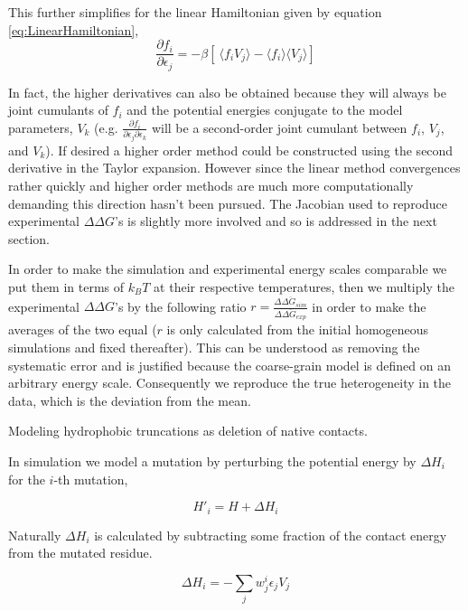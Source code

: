 \documentclass[preprint]{elsarticle}
\begin{document}
    This further simplifies for the linear Hamiltonian given by equation
\ref{eq:LinearHamiltonian},
\begin{equation} \label{eq:JacobianStructural}
    \frac{\partial f_i}{\partial\epsilon_j} = -\beta\left[ \
    \langle f_i V_j \rangle - \langle f_i \rangle \langle V_j \rangle\right]  
\end{equation}

    In fact, the higher derivatives can also be obtained because
they will always be joint cumulants of $f_i$ and the potential energies
conjugate to the model parameters, ${V_k}$ (e.g. $\frac{\partial
f_i}{\partial\epsilon_j\partial\epsilon_k}$ will be a second-order joint
cumulant between $f_i$, $V_j$, and $V_k$). If desired a higher order method
could be constructed using the second derivative in the Taylor expansion.
However since the linear method convergences rather quickly and higher order
methods are much more computationally demanding this direction hasn't been
pursued. The Jacobian used to reproduce experimental $\Delta\Delta G$'s
is slightly more involved and so is addressed in the next section.

    In order to make the simulation and experimental energy scales comparable
we put them in terms of $k_BT$ at their respective temperatures, then we
multiply the experimental $\Delta\Delta G$'s by the following ratio $r =
\frac{\overline{\Delta\Delta G_{sim}}}{\overline{\Delta\Delta G_{exp}}}$ in order
to make the averages of the two equal ($r$ is only calculated from the initial
homogeneous simulations and fixed thereafter). This can be understood as
removing the systematic error and is justified because the coarse-grain model
is defined on an arbitrary energy scale. Consequently we reproduce the true
heterogeneity in the data, which is the deviation from the mean.


    Modeling hydrophobic truncations as deletion of native contacts.

    In simulation we model a mutation by perturbing the potential energy by
$\Delta H_i$ for the $i$-th mutation,

\begin{equation}
    H'_i = H + \Delta H_i
\end{equation}

    Naturally $\Delta H_i$ is calculated by subtracting some fraction of the
contact energy from the mutated residue.

\begin{equation}
\label{eq:Perturbation}
\Delta H_i = -\sum\limits_{j} w^i_j\epsilon_{j} V_{j}
\end{equation}
\end{document}
